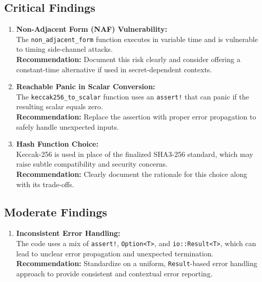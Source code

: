\documentclass[12pt,a4paper]{article}
\begin{document}
\subsection{Critical Findings}
\begin{enumerate}
    \item \textbf{Non-Adjacent Form (NAF) Vulnerability:} \\
    The \texttt{non\_adjacent\_form} function executes in variable time and is vulnerable to timing side-channel attacks. \\
    \textbf{Recommendation:} Document this risk clearly and consider offering a constant-time alternative if used in secret-dependent contexts.
    
    \item \textbf{Reachable Panic in Scalar Conversion:} \\
    The \texttt{keccak256\_to\_scalar} function uses an \texttt{assert!} that can panic if the resulting scalar equals zero. \\
    \textbf{Recommendation:} Replace the assertion with proper error propagation to safely handle unexpected inputs.
    
    \item \textbf{Hash Function Choice:} \\
    Keccak-256 is used in place of the finalized SHA3-256 standard, which may raise subtle compatibility and security concerns. \\
    \textbf{Recommendation:} Clearly document the rationale for this choice along with its trade-offs.
\end{enumerate}

\subsection{Moderate Findings}
\begin{enumerate}
    \item \textbf{Inconsistent Error Handling:} \\
    The code uses a mix of \texttt{assert!}, \texttt{Option<T>}, and \texttt{io::Result<T>}, which can lead to unclear error propagation and unexpected termination. \\
    \textbf{Recommendation:} Standardize on a uniform, \texttt{Result}-based error handling approach to provide consistent and contextual error reporting.
\end{enumerate}
\end{document}
